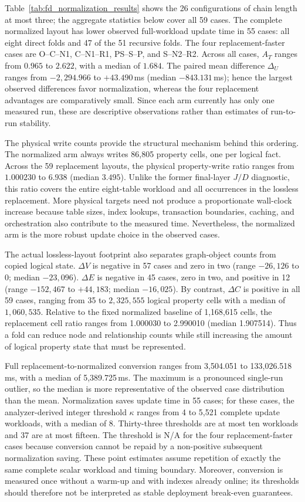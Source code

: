 \documentclass[sigconf]{acmart}
\begin{document}
Table~\ref{tab:fd_normalization_results} shows the 26 configurations of chain
length at most three; the aggregate statistics below cover all 59 cases. The
complete normalized layout has lower observed full-workload update time in 55
cases: all eight direct folds and 47 of the 51 recursive folds. The four
replacement-faster cases are O--C--N1, C--N1--R1, PS--S--P, and S--N2--R2.
Across all cases, $A_T$ ranges from $0.965$ to $2.622$, with a median of
$1.684$. The paired mean difference $\Delta_U$ ranges from
$-2{,}294.966$ to $+43.490$\,ms (median $-843.131$\,ms); hence the largest
observed differences favor normalization, whereas the four replacement
advantages are comparatively small. Since each arm currently has only one
measured run, these are descriptive observations rather than estimates of
run-to-run stability.

The physical write counts provide the structural mechanism behind this
ordering. The normalized arm always writes 86,805 property cells, one per
logical fact. Across the 59 replacement layouts, the physical property-write
ratio ranges from $1.000230$ to $6.938$ (median $3.495$). Unlike the former
final-layer $J/D$ diagnostic, this ratio covers the entire eight-table workload
and all occurrences in the lossless replacement. More physical targets need
not produce a proportionate wall-clock increase because table sizes, index
lookups, transaction boundaries, caching, and orchestration also contribute to
the measured time. Nevertheless, the normalized arm is the more robust update
choice in the observed cases.

The actual lossless-layout footprint also separates graph-object counts from
copied logical state. $\Delta V$ is negative in 57 cases and zero in two
(range $-26{,}126$ to 0; median $-23{,}096$). $\Delta E$ is negative in 45
cases, zero in two, and positive in 12 (range $-152{,}467$ to $+44{,}183$;
median $-16{,}025$). By contrast, $\Delta C$ is positive in all 59 cases,
ranging from 35 to $2{,}325{,}555$ logical property cells with a median of
$1{,}060{,}535$. Relative to the fixed normalized baseline of 1,168,615 cells,
the replacement cell ratio ranges from 1.000030 to 2.990010 (median 1.907514).
Thus a fold can reduce node and relationship counts while still increasing the
amount of logical property state that must be represented.

Full replacement-to-normalized conversion ranges from 3,504.051 to
133,026.518\,ms, with a median of 5,389.725\,ms. The maximum is a pronounced
single-run outlier, so the median is more representative of the observed case
distribution than the mean. Normalization saves update time in 55 cases; for
these cases, the analyzer-derived integer threshold $\kappa$ ranges from 4 to
5,521 complete update workloads, with a median of 8. Thirty-three thresholds
are at most ten workloads and 37 are at most fifteen. The threshold is N/A for
the four replacement-faster cases because conversion cannot be repaid by a
non-positive subsequent normalization saving. These point estimates assume
repetition of exactly the same complete scalar workload and timing boundary.
Moreover, conversion is measured once without a warm-up and with indexes
already online; its thresholds should therefore not be interpreted as stable
deployment break-even guarantees.
\end{document}
